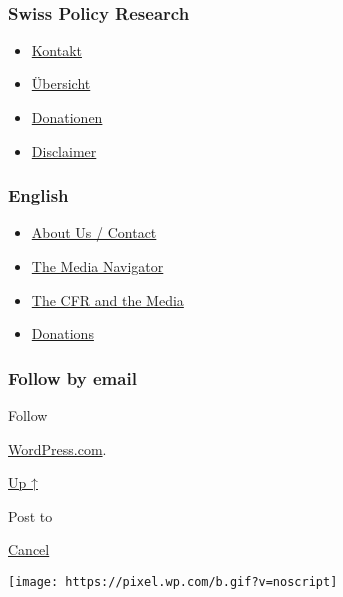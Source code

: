 ~

\hypertarget{swiss-policy-research}{%
\subsubsection{Swiss Policy Research}\label{swiss-policy-research}}

\begin{itemize}
\tightlist
\item
  \href{https://swprs.org/kontakt/}{Kontakt}
\item
  \href{https://swprs.org/uebersicht/}{Übersicht}
\item
  \href{https://swprs.org/donationen/}{Donationen}
\item
  \href{https://swprs.org/disclaimer/}{Disclaimer}
\end{itemize}

\hypertarget{english}{%
\subsubsection{English}\label{english}}

\begin{itemize}
\tightlist
\item
  \href{https://swprs.org/contact/}{About Us / Contact}
\item
  \href{https://swprs.org/media-navigator/}{The Media Navigator}
\item
  \href{https://swprs.org/the-american-empire-and-its-media/}{The CFR
  and the Media}
\item
  \href{https://swprs.org/donations/}{Donations}
\end{itemize}

\hypertarget{follow-by-email}{%
\subsubsection{Follow by email}\label{follow-by-email}}

Follow

\href{https://wordpress.com/?ref=footer_custom_com}{WordPress.com}.

\protect\hyperlink{}{Up ↑}

Post to

\protect\hyperlink{}{Cancel}

\texttt{[image: https://pixel.wp.com/b.gif?v=noscript]}

